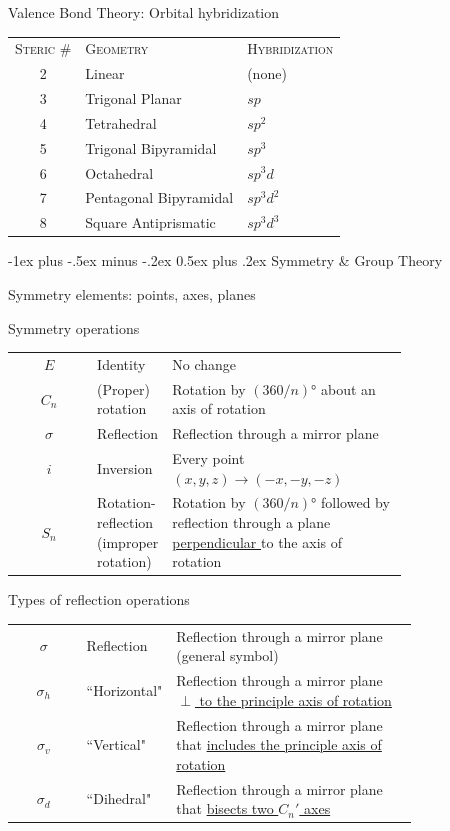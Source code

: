 \documentclass[10pt,landscape]{article}
\makeatletter
\renewcommand{\section}{\@startsection{section}{1}{0mm}%
                                {-1ex plus -.5ex minus -.2ex}%
                                {0.5ex plus .2ex}%
                                {\normalfont\large\bfseries}}
\newcommand{\extraline}{\vspace{1em}}
\newcommand{\halfline}{\vspace{0.5em}}
\newcommand{\tableindent}{\hspace{1.5em}}
\makeatother
\begin{document}
\begin{multicols}{3}
Valence Bond Theory: Orbital hybridization 
\renewcommand{\arraystretch}{1}
\begin{tabular}{@{\tableindent}cll@{}}
	\textsc{Steric \#} & \textsc{Geometry} & \textsc{Hybridization} \\ 
	2 & Linear & (none) \\
	3 & Trigonal Planar 
	& $sp$ \\
	4 & Tetrahedral 
	& $sp^2$ \\
	5 & Trigonal Bipyramidal 
	& $sp^3$ \\
	6 & Octahedral 
	& $sp^3d$ \\
	7 & Pentagonal Bipyramidal & $sp^3d^2$ \\ 
	8 & Square Antiprismatic & $sp^3d^3$ \\
\end{tabular}
\extraline
\renewcommand{\arraystretch}{1.4}

\hrulefill

\section{Symmetry \& Group Theory}


Symmetry elements: points, axes, planes
\halfline

Symmetry operations
%
\renewcommand{\arraystretch}{1.4}
\begin{tabular}{@{\tableindent}cp{0.18\linewidth}<{\raggedright}p{0.6\linewidth}<{\raggedright}@{}}
	$E$ & Identity & No change \\
	$C_n$ & (Proper) rotation  & Rotation by $(360/n)$° about an axis of rotation \\
	$\sigma$ & Reflection  & Reflection through a mirror plane \\
	$i$ & Inversion  & Every point $(x, y, z) \rightarrow (-x, -y, -z)$ \\ %
	$S_n$ & Rotation-reflection (improper rotation)  & Rotation by $(360/n)$° followed by reflection through a plane \underline{perpendicular }to the axis of rotation
\end{tabular}
\renewcommand{\arraystretch}{1}

Types of reflection operations
%
\renewcommand{\arraystretch}{1.4}
\begin{tabular}{@{\tableindent}cp{0.2\linewidth}<{\raggedright}p{0.6\linewidth}<{\raggedright}@{}}
	$\sigma$ & Reflection & Reflection through a mirror plane (general symbol) \\
	$\sigma_h$ & ``Horizontal"  & Reflection through a mirror plane \underline{$\perp$ to the principle axis of rotation} \\
	$\sigma_v$ & ``Vertical" & Reflection through a mirror plane that \underline{includes the principle axis of} \underline{rotation} \\
	$\sigma_d$ & ``Dihedral" & Reflection through a mirror plane that \underline{bisects two $C_n'$ axes} \\
\end{tabular}
\renewcommand{\arraystretch}{1}


\end{multicols}
\end{document}
